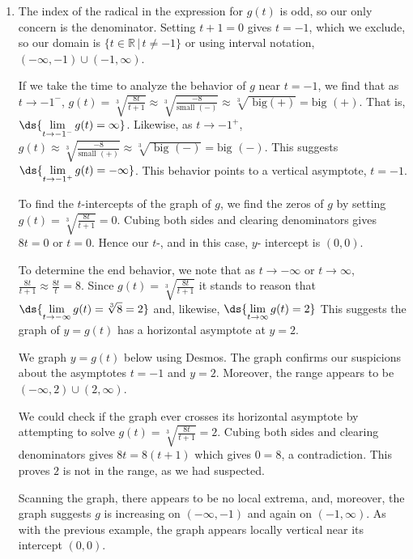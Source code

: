 \documentclass{ximera}
\begin{document}
\begin{example}
\begin{enumerate}
\item  The index of the radical  in the expression for $g(t)$ is odd, so our only concern is the denominator.  Setting $t+1=0$ gives $t=-1$, which we exclude, so our domain is $\{ t \in \mathbb{R} \, | \, t \neq -1\}$ or using interval notation, $(-\infty, -1) \cup (-1, \infty)$.    

If we take the time to analyze the behavior of $g$ near $t=-1$, we find that as $t \rightarrow -1^{-}$, $g(t) = \sqrt[3]{\frac{8t}{t+1}}  \approx \sqrt[3]{\frac{-8}{\text{small $(-)$}}}  \approx \sqrt[3]{\text{ big$(+)$}} = \text{big $(+)$}$.  That is, $\ds{\lim_{t \rightarrow -1^{-}} g(t) = \infty}$.  Likewise, as $t \rightarrow -1^{+}$, $g(t)  \approx \sqrt[3]{\frac{-8}{\text{small $(+)$}}}  \approx \sqrt[3]{\text{ big $(-)$}} = \text{big $(-)$}$.  This suggests  $\ds{\lim_{t \rightarrow -1^{+}} g(t) = -\infty}$.  This behavior points to a vertical asymptote, $t=-1$.

To find the $t$-intercepts of the graph of $g$, we find the zeros of $g$ by setting $g(t) = \sqrt[3]{\frac{8t}{t+1}} = 0$.  Cubing both sides and clearing denominators  gives $8t = 0$ or $t = 0$.  Hence our  $t$-, and in this case,  $y$- intercept is $(0,0)$.

To determine the end behavior, we note that as $t \rightarrow  -\infty$ or $t \rightarrow  \infty$,  $\frac{8t}{t+1} \approx \frac{8t}{t} = 8$.  Since  $g(t) = \sqrt[3]{\frac{8t}{t+1}}$  it stands to reason that $\ds{\lim_{ t \rightarrow -\infty} g(t) =  \sqrt[3]{8} = 2}$ and, likewise, $\ds{\lim_{ t \rightarrow \infty} g(t) = 2}$  This suggests the graph of $y = g(t)$ has a horizontal asymptote at $y = 2$.

We graph $y = g(t)$ below using Desmos. The graph confirms our suspicions about the asymptotes $t = -1$ and $y = 2$.  Moreover, the range appears to be $(-\infty, 2) \cup (2, \infty)$.  

\begin{center}
\end{center}

We could check if the graph ever crosses its horizontal asymptote by attempting to solve $g(t) =  \sqrt[3]{\frac{8t}{t+1}} = 2$.  Cubing both sides and clearing denominators gives $8t = 8(t+1)$ which gives $0 = 8$, a contradiction.  This proves $2$ is not in the range, as we had suspected. 

Scanning the graph,  there  appears to be no local extrema, and, moreover,  the graph suggests $g$  is increasing on $(-\infty, -1)$ and again on $(-1, \infty)$.  As with the previous example, the graph appears locally vertical near its intercept $(0,0)$.


\end{enumerate}
\end{example}
\end{document}
